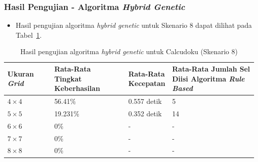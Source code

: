 \documentclass{beamer}
\begin{document}
\begin{frame}
\frametitle{Hasil Pengujian - Algoritma \textit{Hybrid Genetic}}
\begin{itemize}
\item Hasil pengujian algoritma \textit{hybrid genetic} untuk Skenario 8 dapat dilihat pada Tabel~\ref{tab:pengujianhg8}.
\end{itemize}
\begin{table}
\tiny
\centering
\captionsetup{justification=centering}
\caption[Hasil pengujian algoritma \textit{hybrid genetic} untuk Calcudoku (Skenario 8)]{Hasil pengujian algoritma \textit{hybrid genetic} untuk Calcudoku (Skenario 8)}
\begin{tabular}{| l | l | l | l |}
\hline
Ukuran \textit{Grid} & \makecell[c]{Rata-Rata \\ Tingkat Keberhasilan} & \makecell[c]{Rata-Rata \\ Kecepatan} & \makecell[c]{Rata-Rata Jumlah Sel \\ Diisi Algoritma \textit{Rule Based}} \\
\hline \hline
\begin{math}4 \times 4\end{math} & 56.41\% & 0.557 detik & 5 \\
\hline
\begin{math}5 \times 5\end{math} & 19.231\% & 0.352 detik & 14 \\
\hline
\begin{math}6 \times 6\end{math} & 0\% & - & - \\
\hline
\begin{math}7 \times 7\end{math} & 0\% & - & - \\
\hline
\begin{math}8 \times 8\end{math} & 0\% & - & - \\
\hline
\end{tabular}
\label{tab:pengujianhg8}
\end{table}
\end{frame}

\end{document}
